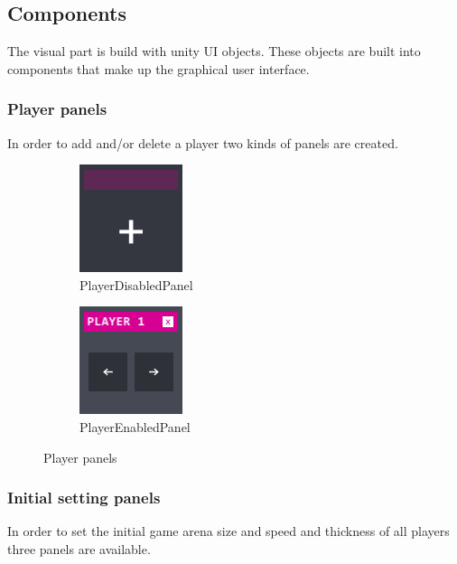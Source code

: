 \subsection{Components}\label{gui-components}
\noindent The visual part is build with unity UI objects. These objects are built into components that make up the graphical user interface.\\

\subsubsection{Player panels}\label{gui-playerpanels}
\noindent In order to add and/or delete a player two kinds of panels are created.

\begin{figure}[!h]\centering
	\captionsetup{justification=centering}
	\begin{subfigure}{0.184\textwidth}
		\includegraphics{gui-imgs/playerdisabledpanel}
		\caption*{PlayerDisabledPanel}
	\end{subfigure}
	\begin{subfigure}{0.184\textwidth}
		\includegraphics{gui-imgs/playerenabledpanel}
		\caption*{PlayerEnabledPanel}
	\end{subfigure}
	\caption{Player panels}
\end{figure}

\subsubsection{Initial setting panels}\label{gui-initialsettingpanels}
\noindent In order to set the initial game arena size and speed and thickness of all players three panels are available.

